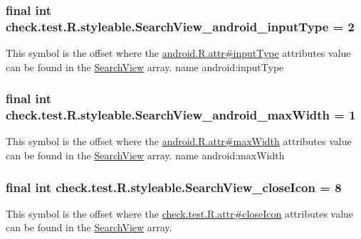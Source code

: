 \subsubsection[{Search\+View\+\_\+android\+\_\+input\+Type}]{\setlength{\rightskip}{0pt plus 5cm}final int check.\+test.\+R.\+styleable.\+Search\+View\+\_\+android\+\_\+input\+Type = 2\hspace{0.3cm}{\ttfamily [static]}}\label{classcheck_1_1test_1_1_r_1_1styleable_a94590242dae34b9e05ef2e5e71613cb4}
This symbol is the offset where the \hyperlink{}{android.\+R.\+attr\#input\+Type} attribute\textquotesingle{}s value can be found in the \hyperlink{classcheck_1_1test_1_1_r_1_1styleable_af133609668e9a4263b21387e9a7574f8}{Search\+View} array.  name android\+:input\+Type \hypertarget{classcheck_1_1test_1_1_r_1_1styleable_a77f942b17351847bdbed74d6b26c17e2}{}
\subsubsection[{Search\+View\+\_\+android\+\_\+max\+Width}]{\setlength{\rightskip}{0pt plus 5cm}final int check.\+test.\+R.\+styleable.\+Search\+View\+\_\+android\+\_\+max\+Width = 1\hspace{0.3cm}{\ttfamily [static]}}\label{classcheck_1_1test_1_1_r_1_1styleable_a77f942b17351847bdbed74d6b26c17e2}
This symbol is the offset where the \hyperlink{}{android.\+R.\+attr\#max\+Width} attribute\textquotesingle{}s value can be found in the \hyperlink{classcheck_1_1test_1_1_r_1_1styleable_af133609668e9a4263b21387e9a7574f8}{Search\+View} array.  name android\+:max\+Width \hypertarget{classcheck_1_1test_1_1_r_1_1styleable_adda1bbb19f8d55c5be43c305e20f2e18}{}
\subsubsection[{Search\+View\+\_\+close\+Icon}]{\setlength{\rightskip}{0pt plus 5cm}final int check.\+test.\+R.\+styleable.\+Search\+View\+\_\+close\+Icon = 8\hspace{0.3cm}{\ttfamily [static]}}\label{classcheck_1_1test_1_1_r_1_1styleable_adda1bbb19f8d55c5be43c305e20f2e18}
This symbol is the offset where the \hyperlink{classcheck_1_1test_1_1_r_1_1attr_a097e97b7282f3297ba754bfa32c9f891}{check.\+test.\+R.\+attr\#close\+Icon} attribute\textquotesingle{}s value can be found in the \hyperlink{classcheck_1_1test_1_1_r_1_1styleable_af133609668e9a4263b21387e9a7574f8}{Search\+View} array.

